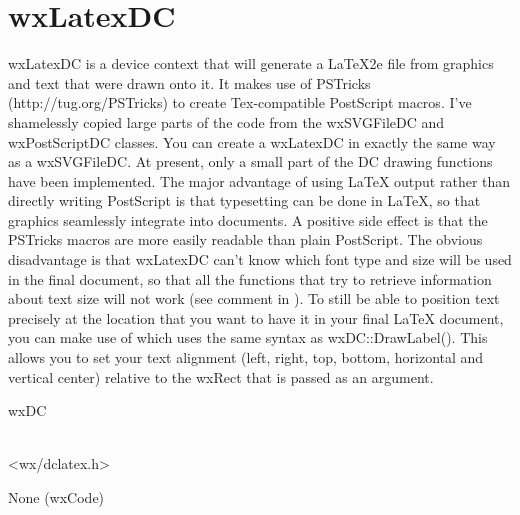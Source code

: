 
\section{wxLatexDC}

wxLatexDC is a device context that will generate a LaTeX2e file from graphics and text that
were drawn onto it. It makes use of PSTricks (http://tug.org/PSTricks) to create Tex-compatible
PostScript macros. I've shamelessly copied large parts of the code from the wxSVGFileDC and
wxPostScriptDC classes. You can create a wxLatexDC in exactly the same way as a wxSVGFileDC.
At present, only a small part of the DC drawing functions have been implemented. 
The major advantage of using LaTeX output rather than directly writing PostScript is that 
typesetting can be done in LaTeX, so that graphics seamlessly integrate into documents. A 
positive side effect is that the PSTricks macros are more easily readable than plain PostScript.
The obvious disadvantage is that wxLatexDC can't know which font type and size will be used in
the final document, so that all the functions that try to retrieve information about text size
will not work (see comment in ). To still be able to
position text precisely at the location that you want to have it in your final LaTeX document, you 
can make use of  which uses the same syntax as 
wxDC::DrawLabel(). This allows you to set your text alignment (left, right, top, bottom, horizontal 
and vertical center) relative to the wxRect that is passed as an argument.


wxDC \\ \\


<wx/dclatex.h>


None (wxCode) \\ \\




